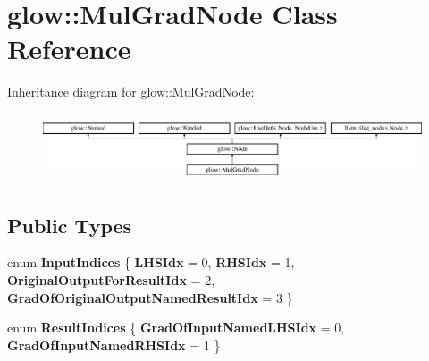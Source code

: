 \hypertarget{classglow_1_1_mul_grad_node}{}\section{glow\+:\+:Mul\+Grad\+Node Class Reference}
\label{classglow_1_1_mul_grad_node}
Inheritance diagram for glow\+:\+:Mul\+Grad\+Node\+:\begin{figure}[H]
\begin{center}
\leavevmode
\includegraphics[height=2.028986cm]{classglow_1_1_mul_grad_node}
\end{center}
\end{figure}
\subsection*{Public Types}
\begin{DoxyCompactItemize}
\item 
\mbox{\label{classglow_1_1_mul_grad_node_acc2b2a6c65a01b1c64d8e08d25d55f74}} 
enum {\bfseries Input\+Indices} \{ {\bfseries L\+H\+S\+Idx} = 0, 
{\bfseries R\+H\+S\+Idx} = 1, 
{\bfseries Original\+Output\+For\+Result\+Idx} = 2, 
{\bfseries Grad\+Of\+Original\+Output\+Named\+Result\+Idx} = 3
 \}
\item 
\mbox{\label{classglow_1_1_mul_grad_node_a6d0515adefc4ada219a4608aab49b111}} 
enum {\bfseries Result\+Indices} \{ {\bfseries Grad\+Of\+Input\+Named\+L\+H\+S\+Idx} = 0, 
{\bfseries Grad\+Of\+Input\+Named\+R\+H\+S\+Idx} = 1
 \}
\end{DoxyCompactItemize}
